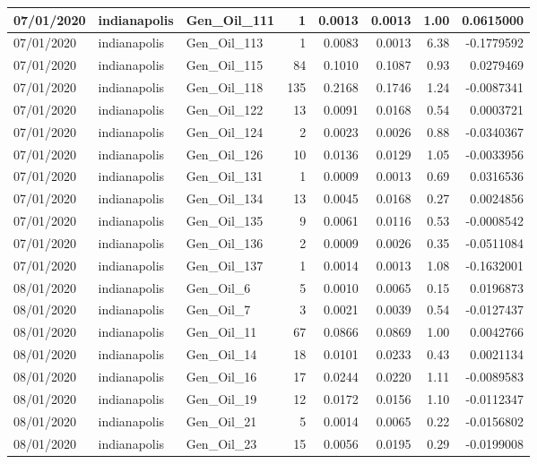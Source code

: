 \documentclass[
  letterpaper,
  DIV=11,
  numbers=noendperiod]{scrartcl}
\begin{document}
\begin{tabular}{l|l|l|r|r|r|r|r}
\hline
07/01/2020 & indianapolis & Gen\_Oil\_111 & 1 & 0.0013 & 0.0013 & 1.00 & 0.0615000\\
\hline
07/01/2020 & indianapolis & Gen\_Oil\_113 & 1 & 0.0083 & 0.0013 & 6.38 & -0.1779592\\
\hline
07/01/2020 & indianapolis & Gen\_Oil\_115 & 84 & 0.1010 & 0.1087 & 0.93 & 0.0279469\\
\hline
07/01/2020 & indianapolis & Gen\_Oil\_118 & 135 & 0.2168 & 0.1746 & 1.24 & -0.0087341\\
\hline
07/01/2020 & indianapolis & Gen\_Oil\_122 & 13 & 0.0091 & 0.0168 & 0.54 & 0.0003721\\
\hline
07/01/2020 & indianapolis & Gen\_Oil\_124 & 2 & 0.0023 & 0.0026 & 0.88 & -0.0340367\\
\hline
07/01/2020 & indianapolis & Gen\_Oil\_126 & 10 & 0.0136 & 0.0129 & 1.05 & -0.0033956\\
\hline
07/01/2020 & indianapolis & Gen\_Oil\_131 & 1 & 0.0009 & 0.0013 & 0.69 & 0.0316536\\
\hline
07/01/2020 & indianapolis & Gen\_Oil\_134 & 13 & 0.0045 & 0.0168 & 0.27 & 0.0024856\\
\hline
07/01/2020 & indianapolis & Gen\_Oil\_135 & 9 & 0.0061 & 0.0116 & 0.53 & -0.0008542\\
\hline
07/01/2020 & indianapolis & Gen\_Oil\_136 & 2 & 0.0009 & 0.0026 & 0.35 & -0.0511084\\
\hline
07/01/2020 & indianapolis & Gen\_Oil\_137 & 1 & 0.0014 & 0.0013 & 1.08 & -0.1632001\\
\hline
08/01/2020 & indianapolis & Gen\_Oil\_6 & 5 & 0.0010 & 0.0065 & 0.15 & 0.0196873\\
\hline
08/01/2020 & indianapolis & Gen\_Oil\_7 & 3 & 0.0021 & 0.0039 & 0.54 & -0.0127437\\
\hline
08/01/2020 & indianapolis & Gen\_Oil\_11 & 67 & 0.0866 & 0.0869 & 1.00 & 0.0042766\\
\hline
08/01/2020 & indianapolis & Gen\_Oil\_14 & 18 & 0.0101 & 0.0233 & 0.43 & 0.0021134\\
\hline
08/01/2020 & indianapolis & Gen\_Oil\_16 & 17 & 0.0244 & 0.0220 & 1.11 & -0.0089583\\
\hline
08/01/2020 & indianapolis & Gen\_Oil\_19 & 12 & 0.0172 & 0.0156 & 1.10 & -0.0112347\\
\hline
08/01/2020 & indianapolis & Gen\_Oil\_21 & 5 & 0.0014 & 0.0065 & 0.22 & -0.0156802\\
\hline
08/01/2020 & indianapolis & Gen\_Oil\_23 & 15 & 0.0056 & 0.0195 & 0.29 & -0.0199008\\

\end{tabular}
\end{document}

